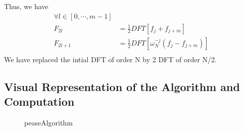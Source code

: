 Thus, we have 
\begin{align*}
    \forall l \in [0, \cdots, m-1]  \\ 
    F_{2l} &= \frac{ 1 }{ 2 } DFT \left[ f_j + f _{ j+m }^{  } \right] \\ 
    F_{2l+1} &= \frac{ 1 }{ 2 } DFT \left[ \omega 
    _{ N }^{ -j } \left(  f_j -f _{ j+m }^{  }\right) \right] \\ 
\end{align*}
We have replaced the intial DFT of order N by 2 DFT of order N/2. 
\newpage 
\subsection{Visual Representation of the Algorithm and Computation}
\label{subsec:Visual Representation of the Algorithm and Computation}
\begin{figure}[ht]
    \centering
    \caption{peaseAlgorithm}
    \label{fig:peasealgorithm}
\end{figure}

